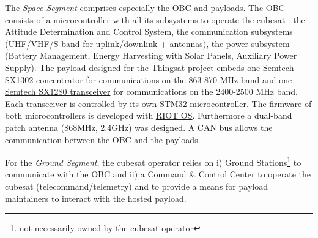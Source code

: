 The \textit{Space Segment}  comprises especially the OBC and payloads. The OBC
consists of a microcontroller with all its subsystems to operate the cubesat :
the Attitude Determination and Control System, the communication subsystems
(UHF/VHF/S-band for uplink/downlink + antennas), the power subsystem (Battery
Management, Energy Harvesting with Solar Panels, Auxiliary Power Supply). The
payload designed for the Thingsat project embeds one
\href{https://www.semtech.com/products/wireless-rf/lora-gateways/sx1302}{Semtech
SX1302 concentrator} for communications on the 863-870 MHz band and one
\href{https://www.semtech.com/products/wireless-rf/24-ghz-transceivers/sx1280}{Semtech
SX1280 transceiver} for communications on the 2400-2500 MHz band. Each
transceiver is controlled by its own STM32 microcontroller. The firmware of both
microcontrollers is developed with \href{https://github.com/RIOT-OS/RIOT}{RIOT
OS}. Furthermore a dual-band patch antenna (868MHz, 2.4GHz) was designed. A CAN
bus allows the communication between the OBC and the payloads.


For the \textit{Ground Segment}, the cubesat operator relies on i) Ground
Stations\footnote{not necessarily owned by the cubesat operator} to communicate
with the OBC and ii) a Command \& Control Center to operate the cubesat
(telecommand/telemetry) and to provide a means for payload maintainers to
interact with the hosted payload.



